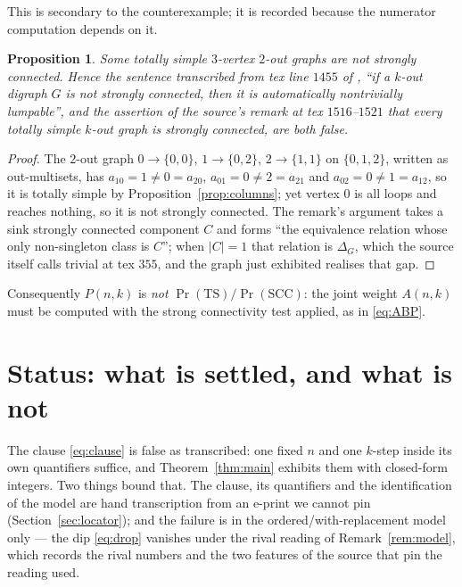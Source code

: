 \documentclass[11pt]{amsart}
\newtheorem{proposition}[theorem]{Proposition}
\theoremstyle{remark}
\newcommand{\SCC}{\mathrm{SCC}}
\newcommand{\TS}{\mathrm{TS}}
\begin{document}
This is secondary to the counterexample; it is recorded because the numerator computation
depends on it.

\begin{proposition}\label{prop:1455}
Some totally simple $3$-vertex $2$-out graphs are not strongly connected.  Hence the
sentence transcribed from tex line $1455$ of \cite{DR}, ``if a $k$-out digraph $G$ is not
strongly connected, then it is automatically nontrivially lumpable'', and the assertion of
the source's remark at tex $1516$--$1521$ that every totally simple $k$-out graph is
strongly connected, are both false.
\end{proposition}

\begin{proof}
The $2$-out graph $0\to\{0,0\}$, $1\to\{0,2\}$, $2\to\{1,1\}$ on $\{0,1,2\}$, written as
out-multisets, has $a_{10}=1\neq0=a_{20}$, $a_{01}=0\neq2=a_{21}$ and
$a_{02}=0\neq1=a_{12}$, so it is totally simple by Proposition~\ref{prop:columns}; yet
vertex $0$ is all loops and reaches nothing, so it is not strongly connected.  The remark's
argument takes a sink strongly connected component $C$ and forms ``the equivalence relation
whose only non-singleton class is $C$''; when $|C|=1$ that relation is $\Delta_G$, which the
source itself calls trivial at tex $355$, and the graph just exhibited realises that gap.
\end{proof}

Consequently $P(n,k)$ is \emph{not} $\Pr(\TS)/\Pr(\SCC)$: the joint weight $A(n,k)$ must be
computed with the strong connectivity test applied, as in \eqref{eq:ABP}.

\section{Status: what is settled, and what is not}
\label{sec:status}

The clause \eqref{eq:clause} is false as transcribed: one fixed $n$ and one $k$-step inside
its own quantifiers suffice, and Theorem~\ref{thm:main} exhibits them with closed-form
integers.  Two things bound that.  The clause, its quantifiers and the identification of the
model are hand transcription from an e-print we cannot pin (Section~\ref{sec:locator}); and
the failure is in the ordered/with-replacement model only --- the dip \eqref{eq:drop}
vanishes under the rival reading of Remark~\ref{rem:model}, which records the rival numbers
and the two features of the source that pin the reading used.
\end{document}
